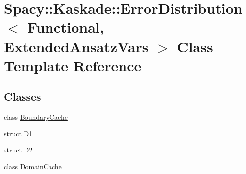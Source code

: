 \hypertarget{classSpacy_1_1Kaskade_1_1ErrorDistribution}{}\section{Spacy\+:\+:Kaskade\+:\+:Error\+Distribution$<$ Functional, Extended\+Ansatz\+Vars $>$ Class Template Reference}
\label{classSpacy_1_1Kaskade_1_1ErrorDistribution}
\subsection*{Classes}
\begin{DoxyCompactItemize}
\item 
class \hyperlink{classSpacy_1_1Kaskade_1_1ErrorDistribution_1_1BoundaryCache}{Boundary\+Cache}
\item 
struct \hyperlink{structSpacy_1_1Kaskade_1_1ErrorDistribution_1_1D1}{D1}
\item 
struct \hyperlink{structSpacy_1_1Kaskade_1_1ErrorDistribution_1_1D2}{D2}
\item 
class \hyperlink{classSpacy_1_1Kaskade_1_1ErrorDistribution_1_1DomainCache}{Domain\+Cache}
\end{DoxyCompactItemize}
